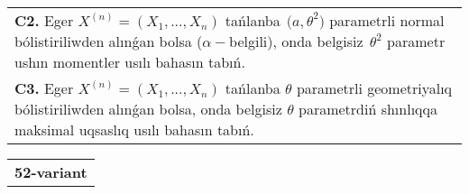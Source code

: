 \documentclass{article}
\begin{document}
\begin{tabular}{m{17cm}}
 \\
\textbf{C2.} 
Eger \(X^{(n)} = \left( X_{1},...,X_{n} \right)\) tańlanba\({\ \ (a,\theta}^{2})\) parametrli normal bólistiriliwden alınǵan bolsa (\(\alpha -\)belgili), onda belgisiz\({\ \ \theta}^{2}\) parametr ushın momentler usılı bahasın tabıń.
 \\
\textbf{C3.} 
Eger \(X^{(n)} = \left( X_{1},...,X_{n} \right)\) tańlanba \(\theta\) parametrli geometriyalıq bólistiriliwden alınǵan bolsa, onda belgisiz \(\theta\) parametrdiń shınlıqqa maksimal uqsaslıq usılı bahasın tabıń.
 \\

\end{tabular}
\vspace{1cm}


\begin{tabular}{m{17cm}}
\textbf{52-variant}
\newline


\end{tabular}
\end{document}
